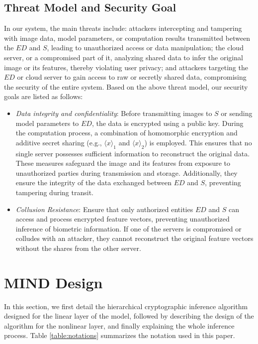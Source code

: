 \documentclass[conference]{IEEEtran}
\begin{document}

\subsection{Threat Model and Security Goal}
In our system, the main threats include: attackers intercepting and tampering with image data, model parameters, or computation results transmitted between the $ED$ and $S$, leading to unauthorized access or data manipulation; the cloud server, or a compromised part of it, analyzing shared data to infer the original image or its features, thereby violating user privacy; and attackers targeting the $ED$ or cloud server to gain access to raw or secretly shared data, compromising the security of the entire system. Based on the above threat model, our security goals are listed as follows:
\begin{itemize}
     \item \textit{Data integrity and confidentiality}: Before transmitting images to $S$ or sending model parameters to $ED$, the data is encrypted using a public key. During the computation process, a combination of homomorphic encryption and additive secret sharing (e.g., $\langle x \rangle_1$ and $\langle x \rangle_2$) is employed. This ensures that no single server possesses sufficient information to reconstruct the original data. These measures safeguard the image and its features from exposure to unauthorized parties during transmission and storage. Additionally, they ensure the integrity of the data exchanged between $ED$ and $S$, preventing tampering during transit. 
     \item \textit{Collusion Resistance}: Ensure that only authorized entities $ED$ and $S$ can access and process encrypted feature vectors, preventing unauthorized inference of biometric information. If one of the servers is compromised or colludes with an attacker, they cannot reconstruct the original feature vectors without the shares from the other server.
 \end{itemize}
 
\section{MIND Design}
In this section, we first detail the hierarchical cryptographic inference algorithm designed for the linear layer of the model, followed by describing the design of the algorithm for the nonlinear layer, and finally explaining the whole inference process. Table \ref{table:notations} summarizes the notation used in this paper.
\end{document}
